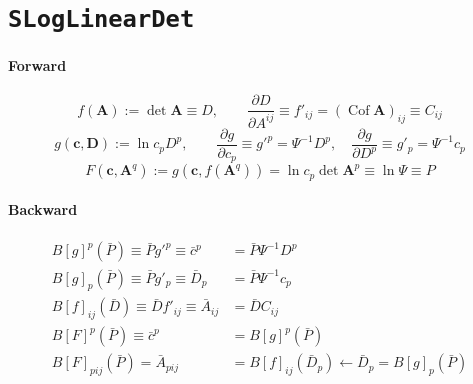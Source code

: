 \documentclass{article}
\begin{document}
\section*{\texttt{SLogLinearDet}}

\paragraph{Forward}
$$
f(\mathbf A):=\det\mathbf A\equiv D,\qquad
%
\frac{\partial D}{\partial A^{ij}}
\equiv f'_{ij}
=(\operatorname{Cof}\mathbf A)_{ij}
\equiv C_{ij}
$$
%
$$
g(\mathbf c,\mathbf D):=\ln c_pD^p,\qquad
\frac{\partial g}{\partial c_p}\equiv g'^p=\Psi^{-1}D^p,\quad
\frac{\partial g}{\partial D^p}\equiv g'_{p}=\Psi^{-1}c_p
$$
%
$$
F(\mathbf c,\mathbf A^q)
:=g(\mathbf c,f(\mathbf A^q))
=\ln c_p\det\mathbf A^p\equiv\ln\Psi\equiv P
$$
\paragraph{Backward}
$$
\begin{aligned}
B[g]^p(\bar P)\equiv\bar Pg'^p\equiv\bar c^p&=\bar P\Psi^{-1}D^p \\
B[g]_p(\bar P)\equiv\bar Pg'_p\equiv\bar D_p&=\bar P\Psi^{-1}c_p \\
B[f]_{ij}(\bar D)\equiv\bar Df'_{ij}\equiv\bar A_{ij}&=\bar DC_{ij} \\
B[F]^p(\bar P)\equiv\bar c^p&=B[g]^p(\bar P) \\
B[F]_{pij}(\bar P)
=\bar A_{pij}
&=B[f]_{ij}(\bar D_p)
\leftarrow\bar D_p=B[g]_p(\bar P)
\end{aligned}
$$
\end{document}
